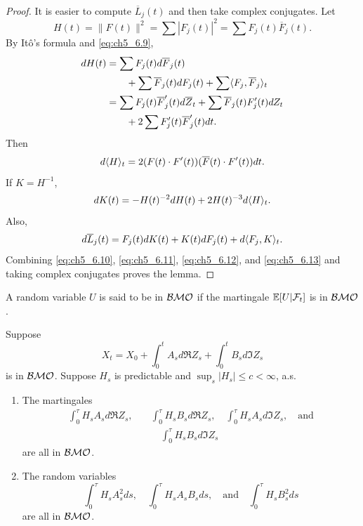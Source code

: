 \begin{proof}
It is easier to compute $\overline{L}_j(t)$ and then take complex conjugates. Let
\[
    H(t) = \|F(t)\|^2 = \sum|F_j(t)|^2 = \sum F_j(t)\overline{F}_j(t).
\]
By It\^o's formula and \eqref{eq:ch5_6.9},
\begin{align}\label{eq:ch5_6.10}
    dH(t) &= \sum F_j(t)d\overline{F}_j(t) \\
    &\qquad+ \sum \overline{F}_j(t)dF_j(t) + \sum \langle F_j,\overline{F}_j \rangle_t \notag \\
    &= \sum F_j(t)\overline{F}'_j(t)d\overline{Z}_t + \sum \overline{F}_j(t)F'_j(t)dZ_t \notag \\
    &\qquad+ 2\sum F'_j(t)\overline{F}'_j(t) dt. \notag
\end{align}
Then
\begin{equation}\label{eq:ch5_6.11}
    d\langle H \rangle_t = 2(F(t) \cdot F'(t))(\overline{F}(t) \cdot F'(t))dt.
\end{equation}
If $K = H^{-1}$,
\begin{equation}\label{eq:ch5_6.12}
    dK(t) = -H(t)^{-2}dH(t) + 2H(t)^{-3}d\langle H \rangle_t.
\end{equation}
Also,
\begin{equation}\label{eq:ch5_6.13}
    d\overline{L}_j(t) = F_j(t)dK(t) + K(t)dF_j(t) + d\langle F_j,K \rangle_t.
\end{equation}
Combining \eqref{eq:ch5_6.10}, \eqref{eq:ch5_6.11}, \eqref{eq:ch5_6.12}, and \eqref{eq:ch5_6.13} and taking complex conjugates proves the lemma.
\end{proof}

A random variable $U$ is said to be in $\mathcal{BMO}$ if the martingale $\mathbb{E}[U| \mathcal{F}_t]$ is in $\mathcal{BMO}$.

\begin{lemma}\label{lem:ch5_6.9}
Suppose
\[
    X_t = X_0 + \int_0^t A_s d\Re Z_s + \int_0^t B_s d\Im Z_s
\]
is in $\mathcal{BMO}$. Suppose $H_s$ is predictable and $\sup_s |H_s| \leq c < \infty$, a.s.
\begin{enumerate}[label=(\alph*)]
    \item The martingales
    \begin{align*}
        \int_0^\tau H_sA_sd\Re Z_s, \quad &\int_0^\tau H_sB_sd\Re Z_s, \quad \int_0^\tau H_sA_sd\Im Z_s, \quad \text{and} \\
        &\quad \int_0^\tau H_sB_sd\Im Z_s
    \end{align*}
    are all in $\mathcal{BMO}$.
    \item The random variables
    \[
        \int_0^\tau H_sA_s^2ds, \quad \int_0^\tau H_sA_sB_sds, \quad \text{and} \quad \int_0^\tau H_sB_s^2ds
    \]
    are all in $\mathcal{BMO}$.
\end{enumerate}
\end{lemma}

